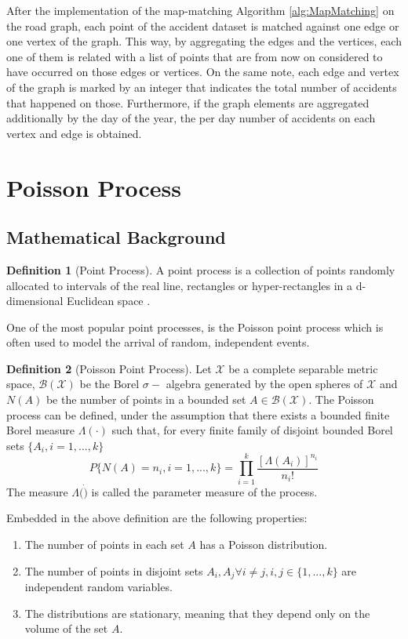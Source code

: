 \documentclass[12pt]{article}
\theoremstyle{definition}
\newtheorem{definition}{Definition}[section]
\begin{document}
After the implementation of the map-matching Algorithm \ref{alg:MapMatching} on the road graph, each point of the accident dataset is matched against one edge or one vertex of the graph. This way, by aggregating the edges and the vertices, each one of them is related with a list of points that are from now on considered to have occurred on those edges or vertices. On the same note, each edge and vertex of the graph is marked by an integer that indicates the total number of accidents that happened on those. Furthermore, if the graph elements are aggregated additionally by the day of the year, the per day number of accidents on each vertex and edge is obtained.

\section{Poisson Process}
\subsection{Mathematical Background}
\begin{definition}[Point Process]
    A point process is a collection of points randomly allocated to intervals of the real line, rectangles or hyper-rectangles in a d-dimensional Euclidean space \cite{daleyPointProcess}.
\end{definition}

One of the most popular point processes, is the Poisson point process which is often used to model the arrival of random, independent events.

\begin{definition}[Poisson Point Process]
    Let $\mathcal{X}$ be a complete separable metric space, $\mathcal{B}(\mathcal{X})$ be the Borel $\sigma-$ algebra generated by the open spheres of $\mathcal{X}$ and $N(A)$ be the number of points in a bounded set $A\in \mathcal{B}(\mathcal{X})$. The Poisson process can be defined, under the assumption that there exists a bounded finite Borel measure $\Lambda(\cdot)$ such that, for every finite family of disjoint bounded Borel sets $\{A_i, i=1,...,k\}$
    \begin{equation}\label{PoissonAbstract}
        P\{N(A)=n_i, i=1,...,k\} = \prod_{i=1}^k\frac{[\Lambda(A_i)]^{n_i}}{n_i!}
    \end{equation}
    The measure $\Lambda(\dot)$ is called the parameter measure of the process. 
\end{definition} 

Embedded in the above definition are the following properties:
\begin{enumerate}
    \item The number of points in each set $A$ has a Poisson distribution.
    \item The number of points in disjoint sets $A_i, A_j \forall i\neq j, i,j\in\{1,...,k\}$ are independent random variables. 
    \item The distributions are stationary, meaning that they depend only on the volume of the set $A$.
\end{enumerate}
\end{document}
